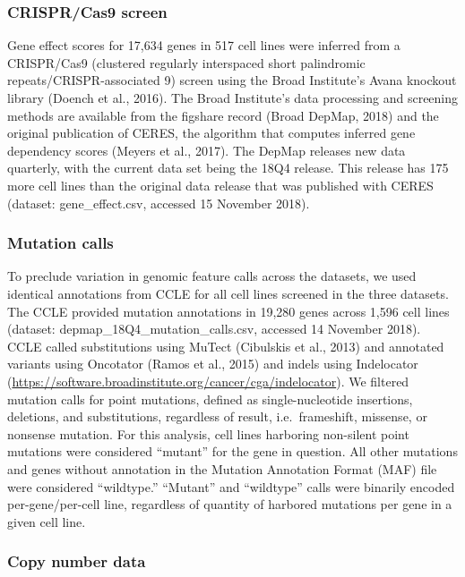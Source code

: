 \documentclass[man]{apa6}
\begin{document}
\subsubsection{CRISPR/Cas9 screen}\label{crisprcas9-screen}

Gene effect scores for 17,634 genes in 517 cell lines were inferred from
a CRISPR/Cas9 (clustered regularly interspaced short palindromic
repeats/CRISPR-associated 9) screen using the Broad Institute's Avana
knockout library (Doench et al., 2016). The Broad Institute's data
processing and screening methods are available from the figshare record
(Broad DepMap, 2018) and the original publication of CERES, the
algorithm that computes inferred gene dependency scores (Meyers et al.,
2017). The DepMap releases new data quarterly, with the current data set
being the 18Q4 release. This release has 175 more cell lines than the
original data release that was published with CERES (dataset:
gene\_effect.csv, accessed 15 November 2018).

\subsubsection{Mutation calls}\label{mutation-calls}

To preclude variation in genomic feature calls across the datasets, we
used identical annotations from CCLE for all cell lines screened in the
three datasets. The CCLE provided mutation annotations in 19,280 genes
across 1,596 cell lines (dataset: depmap\_18Q4\_mutation\_calls.csv,
accessed 14 November 2018). CCLE called substitutions using MuTect
(Cibulskis et al., 2013) and annotated variants using Oncotator (Ramos
et al., 2015) and indels using Indelocator
(\url{https://software.broadinstitute.org/cancer/cga/indelocator}). We
filtered mutation calls for point mutations, defined as
single-nucleotide insertions, deletions, and substitutions, regardless
of result, i.e.~frameshift, missense, or nonsense mutation. For this
analysis, cell lines harboring non-silent point mutations were
considered \enquote{mutant} for the gene in question. All other
mutations and genes without annotation in the Mutation Annotation Format
(MAF) file were considered \enquote{wildtype.} \enquote{Mutant} and
\enquote{wildtype} calls were binarily encoded per-gene/per-cell line,
regardless of quantity of harbored mutations per gene in a given cell
line.

\subsubsection{Copy number data}\label{copy-number-data}
\end{document}
